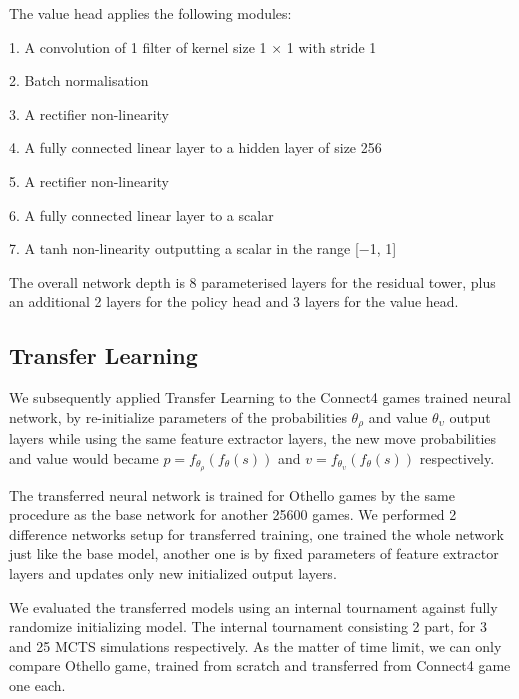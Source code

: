 \documentclass[12pt,a4paper]{article}
\begin{document}
The value head applies the following modules:\par
1. A convolution of 1 filter of kernel size 1 × 1 with stride 1\par
2. Batch normalisation\par
3. A rectifier non-linearity\par
4. A fully connected linear layer to a hidden layer of size 256\par
5. A rectifier non-linearity\par
6. A fully connected linear layer to a scalar\par
7. A tanh non-linearity outputting a scalar in the range [−1, 1]\par
The overall network depth is 8 parameterised layers for the residual tower, plus an additional 2 layers for the policy head and 3 layers for the value head.
\subsection{Transfer Learning}
\hspace{0.6cm} We subsequently applied Transfer Learning to the Connect4 games trained neural network, by re-initialize parameters of the probabilities \(\theta_\rho\) and value \(\theta_\upsilon\) output layers while using the same feature extractor layers, the new move probabilities and value would became \(p = f_{\theta_\rho}(f_\theta(s))\) and \(v = f_{\theta_\upsilon}(f_\theta(s))\) respectively. \par
The transferred neural network is trained for Othello games by the same procedure as the base network for another 25600 games. We performed 2 difference networks setup for transferred training, one trained the whole network just like the base model, another one is by fixed parameters of feature extractor layers and updates only new initialized output layers.\par
We evaluated the transferred models using an internal tournament against fully randomize initializing model. The internal tournament consisting 2 part, for 3 and 25 MCTS simulations respectively. As the matter of time limit, we can only compare Othello game, trained from scratch and transferred from Connect4 game one each.
\end{document}
